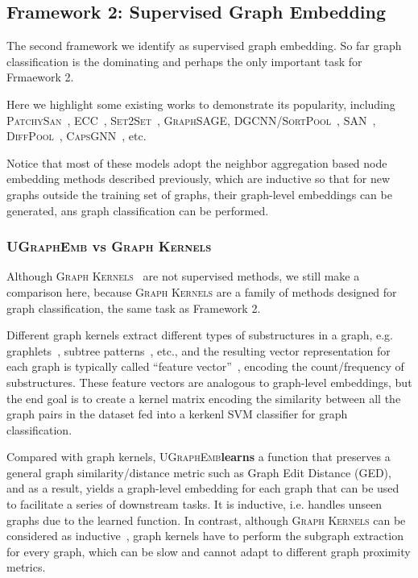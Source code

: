 \documentclass{article}
\newcommand{\model}{\textsc{UGraphEmb}\xspace}
\newcommand{\graphsage}{\textsc{GraphSAGE}\xspace}
\newcommand{\gk}{\textsc{Graph Kernels}\xspace}
\begin{document}
\subsection{Framework 2: Supervised Graph Embedding}

The second framework we identify as supervised graph embedding. So far graph classification is the dominating and perhaps the only important task for Frmaework 2. 

Here we highlight some existing works to demonstrate its popularity, including \textsc{PatchySan}~\cite{niepert2016learning}, \textsc{ECC}~\cite{simonovsky2017dynamic}, \textsc{Set2Set}~\cite{gilmer2017neural}, \graphsage, \textsc{DGCNN/SortPool}~\cite{zhang2018end}, \textsc{SAN}~\cite{zhao2018substructure}, \textsc{DiffPool}~\cite{ying2018hierarchical}, \textsc{CapsGNN}~\cite{zhang2018capsule}, etc.

Notice that most of these models adopt the neighbor aggregation based node embedding methods described previously, which are inductive so that for new graphs outside the training set of graphs, their graph-level embeddings can be generated, ans graph classification can be performed.


\subsubsection{\model vs \gk}


Although \gk~\cite{yanardag2015deep} are not supervised methods, we still make a comparison here, because \gk are a family of methods designed for graph classification, the same task as Framework 2. 

Different graph kernels extract different types of substructures in a graph, e.g. graphlets~\cite{shervashidze2009efficient}, subtree patterns~\cite{shervashidze2009fast}, etc., and the resulting vector representation for each graph is typically called ``feature vector''~\cite{yanardag2015deep}, encoding the count/frequency of substructures. These feature vectors are analogous to graph-level embeddings, but the end goal is to create a kernel matrix encoding the similarity between all the graph pairs in the dataset fed into a kerkenl SVM classifier for graph classification. 

Compared with graph kernels, \model \textbf{{learns}} a function that preserves a general graph similarity/distance metric such as Graph Edit Distance (GED), and as a result, yields a graph-level embedding for each graph that can be used to facilitate a series of downstream tasks. It is inductive, i.e. handles unseen graphs due to the learned function. In contrast, although \gk can be considered as inductive~\cite{shervashidze2011weisfeiler}, graph kernels have to perform the subgraph extraction for every graph, which can be slow and cannot adapt to different graph proximity metrics.
\end{document}
